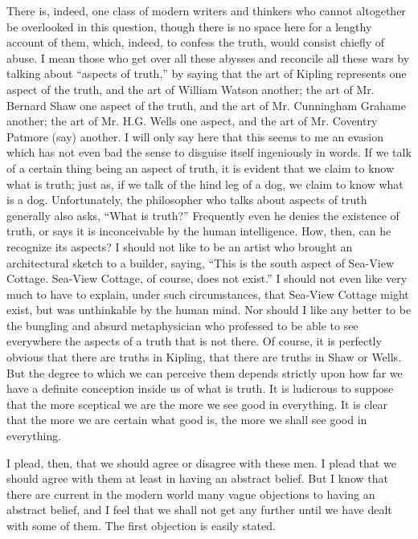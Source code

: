 There is, indeed, one class of modern writers and thinkers who cannot altogether be overlooked in this question, though there is no space here for a lengthy account of them, which, indeed, to confess the truth, would consist chiefly of abuse. I mean those who get over all these abysses and reconcile all these wars by talking about “aspects of truth,” by saying that the art of Kipling represents one aspect of the truth, and the art of William Watson another; the art of Mr. Bernard Shaw one aspect of the truth, and the art of Mr. Cunningham Grahame another; the art of Mr. H.G. Wells one aspect, and the art of Mr. Coventry Patmore (say) another. I will only say here that this seems to me an evasion which has not even bad the sense to disguise itself ingeniously in words. If we talk of a certain thing being an aspect of truth, it is evident that we claim to know what is truth; just as, if we talk of the hind leg of a dog, we claim to know what is a dog. Unfortunately, the philosopher who talks about aspects of truth generally also asks, “What is truth?” Frequently even he denies the existence of truth, or says it is inconceivable by the human intelligence. How, then, can he recognize its aspects? I should not like to be an artist who brought an architectural sketch to a builder, saying, “This is the south aspect of Sea-View Cottage. Sea-View Cottage, of course, does not exist.” I should not even like very much to have to explain, under such circumstances, that Sea-View Cottage might exist, but was unthinkable by the human mind. Nor should I like any better to be the bungling and absurd metaphysician who professed to be able to see everywhere the aspects of a truth that is not there. Of course, it is perfectly obvious that there are truths in Kipling, that there are truths in Shaw or Wells. But the degree to which we can perceive them depends strictly upon how far we have a definite conception inside us of what is truth. It is ludicrous to suppose that the more sceptical we are the more we see good in everything. It is clear that the more we are certain what good is, the more we shall see good in everything.

I plead, then, that we should agree or disagree with these men. I plead that we should agree with them at least in having an abstract belief. But I know that there are current in the modern world many vague objections to having an abstract belief, and I feel that we shall not get any further until we have dealt with some of them. The first objection is easily stated.

